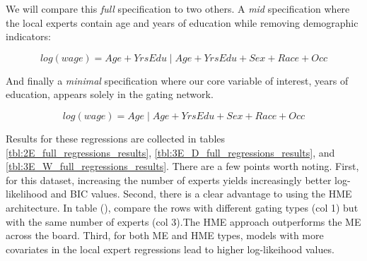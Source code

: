 \documentclass[12pt]{article}
\begin{document}
We will compare this \textit{full} specification to two others. A
\textit{mid} specification where the local experts contain age and
years of education while removing demographic indicators:

\begin{equation}
  log(wage) = Age + YrsEdu \; | \; Age + YrsEdu + Sex +  Race + Occ
\end{equation}

And finally a \textit{minimal} specification where our core variable
of interest, years of education, appears solely in the gating network.

\begin{equation}
  log(wage) = Age \; | \; Age + YrsEdu + Sex +  Race + Occ
\end{equation}

Results for these regressions are collected in tables \ref{tbl:2E_full_regressions_results},
\ref{tbl:3E_D_full_regressions_results}, and \ref{tbl:3E_W_full_regressions_results}.
There are a few points worth noting. First, for this dataset, increasing the
number of experts yields increasingly better log-likelihood and BIC values.
Second, there is a clear advantage to using the HME architecture. In table (), compare the rows with different gating types (col 1)
but with the same number of experts (col 3).The HME approach outperforms the
ME across the board. Third, for both ME and HME types, models with more
covariates in the local expert regressions lead to higher log-likeihood
values. 
\end{document}
